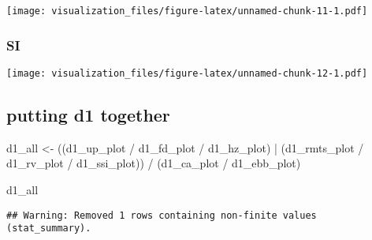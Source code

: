 \documentclass[
]{article}
\newenvironment{Shaded}{\begin{snugshade}}{\end{snugshade}}
\newcommand{\AttributeTok}[1]{\textcolor[rgb]{0.77,0.63,0.00}{#1}}
\newcommand{\FunctionTok}[1]{\textcolor[rgb]{0.00,0.00,0.00}{#1}}
\newcommand{\NormalTok}[1]{#1}
\newcommand{\OtherTok}[1]{\textcolor[rgb]{0.56,0.35,0.01}{#1}}
\newcommand{\SpecialCharTok}[1]{\textcolor[rgb]{0.00,0.00,0.00}{#1}}
\newcommand{\StringTok}[1]{\textcolor[rgb]{0.31,0.60,0.02}{#1}}
\begin{document}
\texttt{[image: visualization\_files/figure-latex/unnamed-chunk-11-1.pdf]}

\hypertarget{si}{%
\subsubsection{SI}\label{si}}

\begin{Shaded}
\end{Shaded}

\texttt{[image: visualization\_files/figure-latex/unnamed-chunk-12-1.pdf]}

\hypertarget{putting-d1-together}{%
\subsection{putting d1 together}\label{putting-d1-together}}

\begin{Shaded}
\begin{Highlighting}[]
\NormalTok{d1\_all }\OtherTok{\textless{}{-}}
\NormalTok{  ((d1\_up\_plot }\SpecialCharTok{/}\NormalTok{ d1\_fd\_plot }\SpecialCharTok{/}\NormalTok{ d1\_hz\_plot) }\SpecialCharTok{|}\NormalTok{ (d1\_rmts\_plot }\SpecialCharTok{/}\NormalTok{ d1\_rv\_plot }\SpecialCharTok{/}\NormalTok{ d1\_ssi\_plot)) }\SpecialCharTok{/}\NormalTok{  (d1\_ca\_plot }\SpecialCharTok{/}\NormalTok{ d1\_ebb\_plot) }
\end{Highlighting}
\end{Shaded}

\begin{Shaded}
\begin{Highlighting}[]
\NormalTok{d1\_all}
\end{Highlighting}
\end{Shaded}

\begin{verbatim}
## Warning: Removed 1 rows containing non-finite values (stat_summary).
\end{verbatim}
\end{document}
